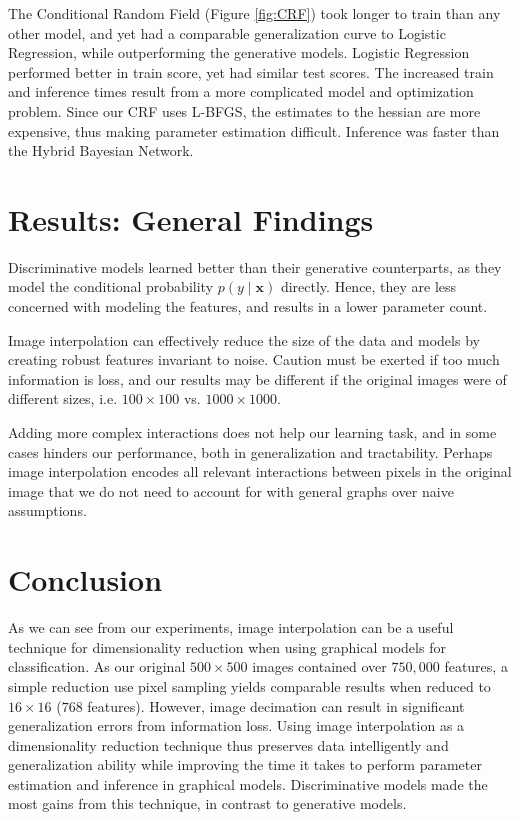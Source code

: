 \documentclass{article}
\begin{document}
The Conditional Random Field (Figure \ref{fig:CRF}) took longer to train than
any other model, and yet
had a comparable generalization curve to Logistic Regression, while outperforming
the generative models. Logistic Regression performed better in train score, yet
had similar test scores. The increased train and inference times result from
a more complicated model and optimization problem. Since our CRF uses L-BFGS,
the estimates to the hessian are more expensive, thus making parameter estimation
difficult. Inference was faster than the Hybrid Bayesian Network.

\section{Results: General Findings}
Discriminative models learned better than their generative counterparts, as they
model the conditional probability $p(y\mid \mathbf{x})$ directly. Hence, they are
less concerned with modeling the features, and results in a lower parameter count.

Image interpolation can effectively reduce the size of the data and models
by creating robust features invariant to noise. Caution must be exerted if too
much information is loss, and our results may be different if the original images
were of different sizes, i.e. $100 \times 100$ vs. $1000 \times 1000$.

Adding more complex interactions does not help our learning task, and in some cases
hinders our performance, both in generalization and tractability. Perhaps image
interpolation encodes all relevant interactions between pixels in the original
image that we do not need to account for with general graphs over naive assumptions.



\section{Conclusion}
\label{sec:conclusion}
As we can see from our experiments, image interpolation can be a useful technique
for dimensionality reduction when using graphical models for classification.
As our original $500 \times 500$ images contained over $750,000$ features, a simple
reduction use pixel sampling yields comparable results when reduced to
$16 \times 16$ ($768$ features). However, image decimation can result in significant
generalization errors from information loss. Using image interpolation as
a dimensionality reduction technique thus preserves data intelligently and
generalization ability while improving the time it takes to perform
parameter estimation and inference in graphical models. Discriminative models
made the most gains from this technique, in contrast to generative models.
\end{document}
